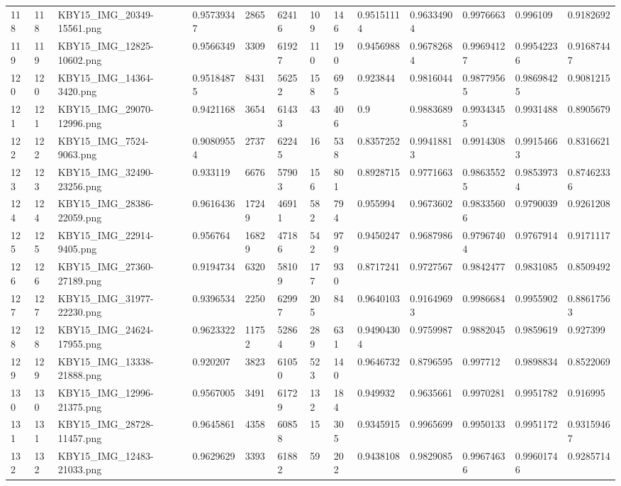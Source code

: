 \documentclass[11pt, a4paper, twoside]{report}
\begin{document}
\begin{longtable}[c]{@{}lllllllllllll@{}}
118 & 118 & KBY15\_IMG\_20349-15561.png & 0.95739347 & 2865 & 62416 & 109 & 146 & 0.95151114 & 0.96334904 & 0.9976663 & 0.996109 & 0.9182692 \\
119 & 119 & KBY15\_IMG\_12825-10602.png & 0.9566349 & 3309 & 61927 & 110 & 190 & 0.9456988 & 0.96782684 & 0.99694127 & 0.99542236 & 0.91687447 \\
120 & 120 & KBY15\_IMG\_14364-3420.png & 0.95184875 & 8431 & 56252 & 158 & 695 & 0.923844 & 0.9816044 & 0.98779565 & 0.98698425 & 0.9081215 \\
121 & 121 & KBY15\_IMG\_29070-12996.png & 0.9421168 & 3654 & 61433 & 43 & 406 & 0.9 & 0.9883689 & 0.99343455 & 0.9931488 & 0.8905679 \\
122 & 122 & KBY15\_IMG\_7524-9063.png & 0.90809554 & 2737 & 62245 & 16 & 538 & 0.8357252 & 0.99418813 & 0.9914308 & 0.99154663 & 0.8316621 \\
123 & 123 & KBY15\_IMG\_32490-23256.png & 0.933119 & 6676 & 57903 & 156 & 801 & 0.8928715 & 0.9771663 & 0.98635525 & 0.98539734 & 0.87462336 \\
124 & 124 & KBY15\_IMG\_28386-22059.png & 0.9616436 & 17249 & 46911 & 582 & 794 & 0.955994 & 0.9673602 & 0.98335606 & 0.9790039 & 0.9261208 \\
125 & 125 & KBY15\_IMG\_22914-9405.png & 0.956764 & 16829 & 47186 & 542 & 979 & 0.9450247 & 0.9687986 & 0.97967404 & 0.9767914 & 0.9171117 \\
126 & 126 & KBY15\_IMG\_27360-27189.png & 0.9194734 & 6320 & 58109 & 177 & 930 & 0.8717241 & 0.9727567 & 0.9842477 & 0.9831085 & 0.8509492 \\
127 & 127 & KBY15\_IMG\_31977-22230.png & 0.9396534 & 2250 & 62997 & 205 & 84 & 0.9640103 & 0.91649693 & 0.9986684 & 0.9955902 & 0.88617563 \\
128 & 128 & KBY15\_IMG\_24624-17955.png & 0.9623322 & 11752 & 52864 & 289 & 631 & 0.94904304 & 0.9759987 & 0.9882045 & 0.9859619 & 0.927399 \\
129 & 129 & KBY15\_IMG\_13338-21888.png & 0.920207 & 3823 & 61050 & 523 & 140 & 0.9646732 & 0.8796595 & 0.997712 & 0.9898834 & 0.8522069 \\
130 & 130 & KBY15\_IMG\_12996-21375.png & 0.9567005 & 3491 & 61729 & 132 & 184 & 0.949932 & 0.9635661 & 0.9970281 & 0.9951782 & 0.916995 \\
131 & 131 & KBY15\_IMG\_28728-11457.png & 0.9645861 & 4358 & 60858 & 15 & 305 & 0.9345915 & 0.9965699 & 0.9950133 & 0.9951172 & 0.93159467 \\
132 & 132 & KBY15\_IMG\_12483-21033.png & 0.9629629 & 3393 & 61882 & 59 & 202 & 0.9438108 & 0.9829085 & 0.99674636 & 0.99601746 & 0.9285714 \\

\end{longtable}
\end{document}

